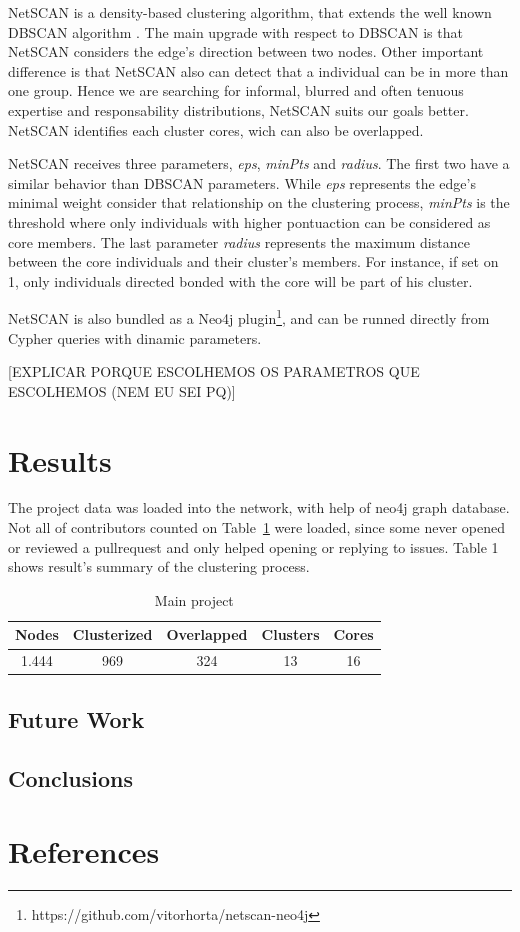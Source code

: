 \documentclass[conference]{IEEEtran}
\begin{document}
NetSCAN\cite{horta2018} is a density-based clustering algorithm, that extends the well known DBSCAN algorithm \cite{ester1996}. The main upgrade with respect to DBSCAN is that NetSCAN considers the edge's direction between two nodes. Other important difference is that NetSCAN also can detect that a individual can be in more than one group. Hence we are searching for informal, blurred and often tenuous expertise and responsability distributions, NetSCAN suits our goals better. NetSCAN identifies each cluster cores, wich can also be overlapped.

NetSCAN receives three parameters, \textit{eps}, \textit{minPts} and \textit{radius}. The first two have a similar behavior than DBSCAN parameters. While \textit{eps} represents the edge's minimal weight consider that relationship on the clustering process, \textit{minPts} is the threshold where only individuals with higher pontuaction can be considered as core members. The last parameter \textit{radius} represents the maximum distance between the core individuals and their cluster's members. For instance, if set on 1, only individuals directed bonded with the core will be part of his cluster.

NetSCAN is also bundled as a Neo4j plugin\footnote{https://github.com/vitorhorta/netscan-neo4j}, and can be runned directly from Cypher queries with dinamic parameters.

[EXPLICAR PORQUE ESCOLHEMOS OS PARAMETROS QUE ESCOLHEMOS (NEM EU SEI PQ)]

\section{Results}

The project data was loaded into the network, with help of neo4j graph database. Not all of contributors counted on Table~\ref{tab:sizemetrics} were loaded, since some never opened or reviewed a pullrequest and only helped opening or replying to issues. Table 1 shows result's summary of the clustering process.

\begin{table}[htbp]
\caption{Main project}
\begin{center}
\begin{tabular}{|c|c|c|c|c|}
\hline
\textbf{Nodes} & \textbf{Clusterized}& \textbf{Overlapped} & \textbf{Clusters} & \textbf{Cores} \\
\hline
1.444 & 969 & 324 & 13 & 16 \\
\hline
\end{tabular}
\label{tab:sizemetrics}
\end{center}
\end{table}

\subsection{Future Work}

\subsection{Conclusions}

\section*{References}


\end{document}
